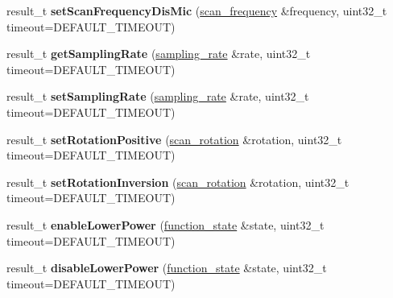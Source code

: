 \begin{DoxyCompactItemize}
\item 
result\+\_\+t {\bfseries set\+Scan\+Frequency\+Dis\+Mic} (\hyperlink{structscan__frequency}{scan\+\_\+frequency} \&frequency, uint32\+\_\+t timeout=D\+E\+F\+A\+U\+L\+T\+\_\+\+T\+I\+M\+E\+O\+UT)\hypertarget{classydlidar_1_1_y_dlidar_driver_a00e69cf360eeca890dbaf964ab6f67b7}{}\label{classydlidar_1_1_y_dlidar_driver_a00e69cf360eeca890dbaf964ab6f67b7}

\item 
result\+\_\+t {\bfseries get\+Sampling\+Rate} (\hyperlink{structsampling__rate}{sampling\+\_\+rate} \&rate, uint32\+\_\+t timeout=D\+E\+F\+A\+U\+L\+T\+\_\+\+T\+I\+M\+E\+O\+UT)\hypertarget{classydlidar_1_1_y_dlidar_driver_a7b7812329013f119235abf74da397aaa}{}\label{classydlidar_1_1_y_dlidar_driver_a7b7812329013f119235abf74da397aaa}

\item 
result\+\_\+t {\bfseries set\+Sampling\+Rate} (\hyperlink{structsampling__rate}{sampling\+\_\+rate} \&rate, uint32\+\_\+t timeout=D\+E\+F\+A\+U\+L\+T\+\_\+\+T\+I\+M\+E\+O\+UT)\hypertarget{classydlidar_1_1_y_dlidar_driver_a30f9219bcf3aa3a8df2bbdae983ccd02}{}\label{classydlidar_1_1_y_dlidar_driver_a30f9219bcf3aa3a8df2bbdae983ccd02}

\item 
result\+\_\+t {\bfseries set\+Rotation\+Positive} (\hyperlink{structscan__rotation}{scan\+\_\+rotation} \&rotation, uint32\+\_\+t timeout=D\+E\+F\+A\+U\+L\+T\+\_\+\+T\+I\+M\+E\+O\+UT)\hypertarget{classydlidar_1_1_y_dlidar_driver_ae6645c26b9b46b2aa4aaae87521a38f1}{}\label{classydlidar_1_1_y_dlidar_driver_ae6645c26b9b46b2aa4aaae87521a38f1}

\item 
result\+\_\+t {\bfseries set\+Rotation\+Inversion} (\hyperlink{structscan__rotation}{scan\+\_\+rotation} \&rotation, uint32\+\_\+t timeout=D\+E\+F\+A\+U\+L\+T\+\_\+\+T\+I\+M\+E\+O\+UT)\hypertarget{classydlidar_1_1_y_dlidar_driver_a1569723d0e46b801aee5284455f3b1d1}{}\label{classydlidar_1_1_y_dlidar_driver_a1569723d0e46b801aee5284455f3b1d1}

\item 
result\+\_\+t {\bfseries enable\+Lower\+Power} (\hyperlink{structfunction__state}{function\+\_\+state} \&state, uint32\+\_\+t timeout=D\+E\+F\+A\+U\+L\+T\+\_\+\+T\+I\+M\+E\+O\+UT)\hypertarget{classydlidar_1_1_y_dlidar_driver_a85a9af2aff7201a42f000299990b0ce5}{}\label{classydlidar_1_1_y_dlidar_driver_a85a9af2aff7201a42f000299990b0ce5}

\item 
result\+\_\+t {\bfseries disable\+Lower\+Power} (\hyperlink{structfunction__state}{function\+\_\+state} \&state, uint32\+\_\+t timeout=D\+E\+F\+A\+U\+L\+T\+\_\+\+T\+I\+M\+E\+O\+UT)\hypertarget{classydlidar_1_1_y_dlidar_driver_a18895e94f42ce61890b4912727cdfbd8}{}\label{classydlidar_1_1_y_dlidar_driver_a18895e94f42ce61890b4912727cdfbd8}


\end{DoxyCompactItemize}
